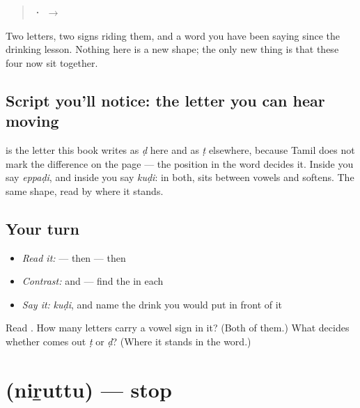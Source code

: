 \begin{quote}
\textbf{ ·  $\to$ }
\end{quote}

Two letters, two signs riding them, and a word you have been saying since the drinking lesson. Nothing here is a new shape; the only new thing is that these four now sit together.

\subsection*{Script you'll notice: the letter you can hear moving}
\textbf{} is the letter this book writes as \emph{ḍ} here and as \emph{ṭ} elsewhere, because Tamil does not mark the difference on the page — the position in the word decides it. Inside \textbf{} you say \emph{eppaḍi}, and inside \textbf{} you say \emph{kuḍi}: in both, \textbf{} sits between vowels and softens. The same shape, read by where it stands.

\subsection*{Your turn}
\begin{itemize}
\raggedright
  \item \emph{Read it:} \textbf{} — then \textbf{} — then \textbf{}
  \item \emph{Contrast:} \textbf{} and \textbf{} — find the \textbf{} in each
  \item \emph{Say it:} \emph{kuḍi}, and name the drink you would put in front of it
\end{itemize}

\begin{tcolorbox}[breakable,colback=teal!4,colframe=teal!35!black,title={Before you move on}]
Read \textbf{}. How many letters carry a vowel sign in it? (Both of them.) What decides whether \textbf{} comes out \emph{ṭ} or \emph{ḍ}? (Where it stands in the word.)
\end{tcolorbox}
\section[\texorpdfstring{\ta{நிறுத்து} (niṟuttu)}{நிறுத்து (niṟuttu)}]{ (niṟuttu) — stop}

\label{lesson:TA-C65-stop}



